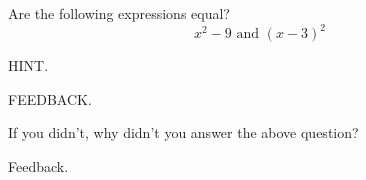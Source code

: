 \documentclass{ximera}
\begin{document}
\begin{problem} 
\begin{problem}
    Are the following expressions equal?
    $$x^2 - 9 \text{ and } (x-3)^2$$
    
    \begin{hint}
    HINT.
    \end{hint}
    
  \begin{multipleChoice}
      
        \begin{feedback}[attempt]
        FEEDBACK.
        \end{feedback}
        
  \end{multipleChoice}

\end{problem}

\begin{question}
  
    If you didn't, why didn't you answer the above question?
  
  \begin{multipleChoice}
      
      \begin{feedback}[attempt]
      Feedback.
      \end{feedback}
      
  \end{multipleChoice}
\end{question}
\end{problem}
\end{document}
